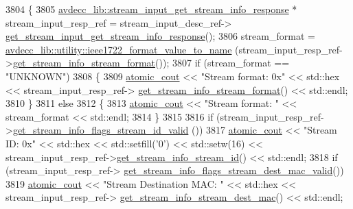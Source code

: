 \begin{DoxyCode}
3804         \{
3805             \hyperlink{classavdecc__lib_1_1stream__input__get__stream__info__response}{avdecc\_lib::stream\_input\_get\_stream\_info\_response}
       * stream\_input\_resp\_ref = stream\_input\_desc\_ref->
      \hyperlink{classavdecc__lib_1_1stream__input__descriptor_a92a813816ec8dc069c9fb42909eb0ace}{get\_stream\_input\_get\_stream\_info\_response}();
3806             stream\_format = \hyperlink{namespaceavdecc__lib_1_1utility_a65f055a50d3d236b67d30c1a7b8425c8}{avdecc\_lib::utility::ieee1722\_format\_value\_to\_name}
      (stream\_input\_resp\_ref->\hyperlink{classavdecc__lib_1_1stream__input__get__stream__info__response_a44d4cdbe40182ecac3559f462a52fb6c}{get\_stream\_info\_stream\_format}());
3807             \textcolor{keywordflow}{if} (stream\_format == \textcolor{stringliteral}{"UNKNOWN"})
3808             \{
3809                 \hyperlink{cmd__line_8h_a0bc38ccc65c79ba06c6fcd7b4bf554c3}{atomic\_cout} << \textcolor{stringliteral}{"Stream format: 0x"} << std::hex << stream\_input\_resp\_ref->
      \hyperlink{classavdecc__lib_1_1stream__input__get__stream__info__response_a44d4cdbe40182ecac3559f462a52fb6c}{get\_stream\_info\_stream\_format}() << std::endl;
3810             \}
3811             \textcolor{keywordflow}{else}
3812             \{
3813                 \hyperlink{cmd__line_8h_a0bc38ccc65c79ba06c6fcd7b4bf554c3}{atomic\_cout} << \textcolor{stringliteral}{"Stream format: "} << stream\_format << std::endl;
3814             \}
3815 
3816             \textcolor{keywordflow}{if} (stream\_input\_resp\_ref->\hyperlink{classavdecc__lib_1_1stream__input__get__stream__info__response_aac97139921d5f55f8f166b8f013766a1}{get\_stream\_info\_flags\_stream\_id\_valid}
      ())
3817                 \hyperlink{cmd__line_8h_a0bc38ccc65c79ba06c6fcd7b4bf554c3}{atomic\_cout} << \textcolor{stringliteral}{"Stream ID: 0x"} << std::hex << std::setfill(\textcolor{charliteral}{'0'}) << std::setw(16)
       << stream\_input\_resp\_ref->\hyperlink{classavdecc__lib_1_1stream__input__get__stream__info__response_a075bc859c84291de462603064f31dd06}{get\_stream\_info\_stream\_id}() << std::endl;
3818             \textcolor{keywordflow}{if} (stream\_input\_resp\_ref->
      \hyperlink{classavdecc__lib_1_1stream__input__get__stream__info__response_a1089d406a845dc42da30dbb1cd627f09}{get\_stream\_info\_flags\_stream\_dest\_mac\_valid}())
3819                 \hyperlink{cmd__line_8h_a0bc38ccc65c79ba06c6fcd7b4bf554c3}{atomic\_cout} << \textcolor{stringliteral}{"Stream Destination MAC: "} << std::hex << stream\_input\_resp\_ref->
      \hyperlink{classavdecc__lib_1_1stream__input__get__stream__info__response_a81e48c219d69340880c1698e196d644e}{get\_stream\_info\_stream\_dest\_mac}() << std::endl;

\end{DoxyCode}
